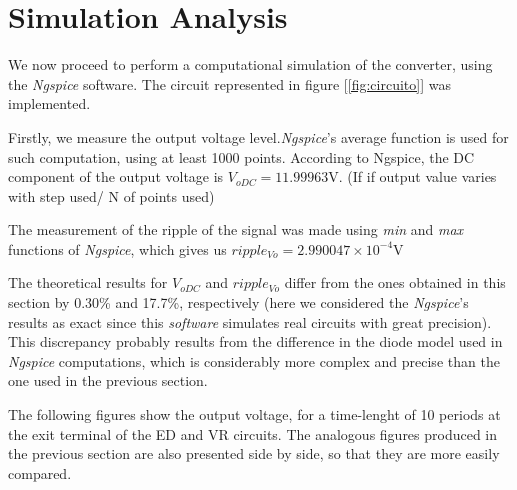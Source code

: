 \section{Simulation Analysis}
\label{sec:simulation}

\par We now proceed to perform a computational simulation of the converter, using the \textit{Ngspice} software. The circuit represented in figure [\ref{fig:circuito}] was implemented.

Firstly, we measure the output voltage level.\textit{Ngspice}'s average function is used for such computation, using at least 1000 points. According to Ngspice, the DC component of the output voltage
is $V_{oDC}=11.99963$V. (If if output value varies with step used/ N of points used)\par
The measurement of the ripple of the signal was made using \textit{min} and \textit{max} functions of \textit{Ngspice}, which gives us $ripple_{Vo}=2.990047 \times 10^{-4}$V

The theoretical results for $V_{oDC}$ and $ripple_{Vo}$ differ from the ones obtained in this section  by 0.30\% and 17.7\%, respectively (here we considered the \textit{Ngspice}'s results as exact since this \textit{software} simulates real circuits with great precision).
This discrepancy probably results from the difference in the diode model used in \textit{Ngspice} computations, which is considerably more complex and precise than the one used in the previous section.

The following figures show the output voltage, for a time-lenght of 10 periods at the exit terminal of the ED and VR circuits.  The analogous figures produced in the previous section are also presented side by side, so that they are more easily compared.

